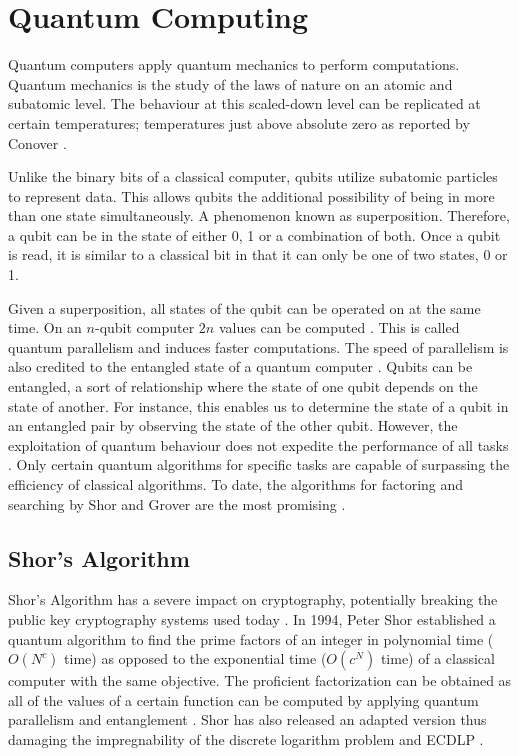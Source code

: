 \section{Quantum Computing}
Quantum computers apply quantum mechanics to perform computations. Quantum mechanics is the study of the laws of nature on an atomic and subatomic level. The behaviour at this scaled-down level can be replicated at certain temperatures; temperatures just above absolute zero as reported by Conover \cite{Q_Comp_Real}.

Unlike the binary bits of a classical computer, qubits utilize subatomic particles to represent data. 
This allows qubits the additional possibility of being in more than one state simultaneously.
A phenomenon known as superposition. Therefore, a qubit can be in the state of either 0, 1 or a combination of both. Once a qubit is read, it is similar to a classical bit in that it can only be one of two states, 0 or 1.

Given a superposition, all states of the qubit can be operated on at the same time. On an \(n\)-qubit computer \(2n\) values can be computed \cite{Impact_QC_Cryptog}. This is called quantum parallelism and induces faster computations. The speed of parallelism is also credited to the entangled state of a quantum computer \cite{Impact_QC_Cryptog_1}. 
Qubits can be entangled, a sort of relationship where the state of one qubit depends on the state of another. For instance, this enables us to determine the state of a qubit in an entangled pair by observing the state of the other qubit. 
However, the exploitation of quantum behaviour does not expedite the performance of all tasks \cite{Q_Comp_Real}. Only certain quantum algorithms for specific tasks are capable of surpassing the efficiency of classical algorithms. To date, the algorithms for factoring and searching by Shor and Grover are the most promising \cite{Impact_QC_Cryptog_1}.

\subsection{Shor's Algorithm}
Shor's Algorithm has a severe impact on cryptography, potentially breaking the public key cryptography systems used today \cite{Q_Alg}.
In 1994, Peter Shor established a quantum algorithm to find the prime factors of an integer in polynomial time (\(O(N^c)\) time) as opposed to the exponential time (\(O(c^N)\) time) of a classical computer with the same objective. 
The proficient factorization can be obtained as all of the values of a certain function can be computed by applying quantum parallelism and entanglement \cite{Impact_QC_Cryptog_1}. 
Shor has also released an adapted version thus damaging the impregnability of the discrete logarithm problem and ECDLP \cite{Post_Q_Cryptog}. 

